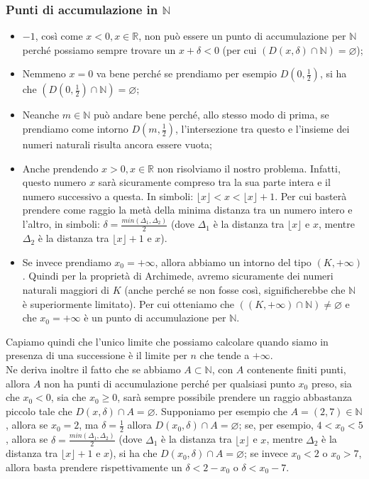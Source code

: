 \documentclass{article}
\begin{document}
\subsubsection{Punti di accumulazione in $\mathbb{N}$}
\begin{itemize}
    \item $-1$, così come $x < 0, x \in \mathbb{R}$, non può essere un punto di accumulazione per $\mathbb{N}$ perché possiamo sempre trovare un $x +\delta < 0$ (per cui $(D(x, \delta) \cap \mathbb{N}) = \varnothing$);
    \item Nemmeno $x = 0$ va bene perché se prendiamo per esempio $D(0, \frac{1}{2})$, si ha che $(D(0, \frac{1}{2}) \cap \mathbb{N}) = \varnothing$;
    \item Neanche $m \in \mathbb{N}$ può andare bene perché, allo stesso modo di prima, se prendiamo come intorno $D(m, \frac{1}{2})$, l'intersezione tra questo e l'insieme dei numeri naturali risulta ancora essere vuota;
    \item Anche prendendo $x > 0, x \in \mathbb{R}$ non risolviamo il nostro problema. Infatti, questo numero $x$ sarà sicuramente compreso tra la sua parte intera e il numero successivo a questa. In simboli: $\lfloor x \rfloor < x < \lfloor x \rfloor + 1$. Per cui basterà prendere come raggio la metà della minima distanza tra un numero intero e l'altro, in simboli: $\delta = \frac{min(\Delta_1, \Delta_2)}{2}$ (dove $\Delta_1$ è la distanza tra $\lfloor x \rfloor$ e $x$, mentre $\Delta_2$ è la distanza tra $\lfloor x \rfloor + 1$ e $x$).
    \item Se invece prendiamo $x_0 = +\infty$, allora abbiamo un intorno del tipo $(K, +\infty)$. Quindi per la proprietà di Archimede, avremo sicuramente dei numeri naturali maggiori di $K$ (anche perché se non fosse così, significherebbe che $\mathbb{N}$ è superiormente limitato). Per cui otteniamo che $((K, + \infty) \cap \mathbb{N}) \neq \varnothing$ e che $x_0 = +\infty$ è un punto di accumulazione per $\mathbb{N}$.
\end{itemize}

\noindent Capiamo quindi che l'unico limite che possiamo calcolare quando siamo in presenza di una successione è il limite per $n$ che tende a $+\infty$.\\

\noindent Ne deriva inoltre il fatto che se abbiamo $A \subset \mathbb{N}$, con $A$ contenente finiti punti, allora $A$ non ha punti di accumulazione perché per qualsiasi punto $x_0$ preso, sia che $x_0 < 0$, sia che $x_0 \geq 0$, sarà sempre possibile prendere un raggio abbastanza piccolo tale che $D(x, \delta) \cap A = \varnothing$. Supponiamo per esempio che $A = (2, 7) \in \mathbb{N}$, allora se $x_0 = 2$, ma $\delta = \frac{1}{2}$ allora $D(x_0, \delta) \cap A = \varnothing$; se, per esempio, $4 < x_0 < 5$, allora se $\delta = \frac{min(\Delta_1, \Delta_2)}{2}$ (dove $\Delta_1$ è la distanza tra $\lfloor x \rfloor$ e $x$, mentre $\Delta_2$ è la distanza tra $\lfloor x \rfloor + 1$ e $x$), si ha che $D(x_0, \delta) \cap A = \varnothing$; se invece $x_0 < 2$ o $x_0 > 7$, allora basta prendere rispettivamente un $\delta < 2 - x_0$ o $\delta < x_0 - 7$.\\
\end{document}
